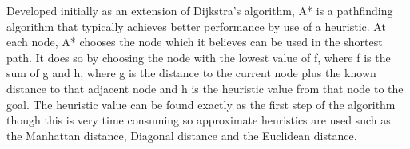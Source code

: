 Developed initially as an extension of Dijkstra's algorithm, A* is a 
pathfinding algorithm that typically achieves better performance by 
use of a heuristic. At each node, A* chooses the node which it believes 
can be used in the shortest path. It does so by choosing the node with 
the lowest value of f, where f is the sum of g and h, where g is the 
distance to the current node plus the known distance to that adjacent 
node and h is the heuristic value from that node to the goal. The heuristic 
value can be found exactly as the first step of the algorithm though 
this is very time consuming so approximate heuristics are used such 
as the Manhattan distance, Diagonal distance and the Euclidean distance. 
